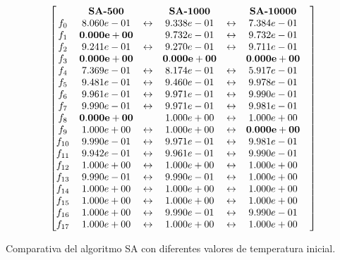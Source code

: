 \begin{table}[!ht]
  \centering
\[
\begin{bmatrix}
   & \textbf{SA-500} &  & \textbf{SA-1000} & & \textbf{SA-10000} \\
f_{0} & 8.060e-01 & \leftrightarrow & 9.338e-01 & \leftrightarrow & 7.384e-01 \\
f_{1} & {\bf 0.000e+00} &  & 9.732e-01 & \leftrightarrow & 9.732e-01 \\
f_{2} & 9.241e-01 & \leftrightarrow & 9.270e-01 & \leftrightarrow & 9.711e-01 \\
f_{3} & {\bf 0.000e+00} &  & {\bf 0.000e+00} &  & {\bf 0.000e+00} &  \\
f_{4} & 7.369e-01 & \leftrightarrow & 8.174e-01 & \leftrightarrow & 5.917e-01 \\
f_{5} & 9.481e-01 & \leftrightarrow & 9.460e-01 & \leftrightarrow & 9.978e-01 \\
f_{6} & 9.961e-01 & \leftrightarrow & 9.971e-01 & \leftrightarrow & 9.990e-01 \\
f_{7} & 9.990e-01 & \leftrightarrow & 9.971e-01 & \leftrightarrow & 9.981e-01 \\
f_{8} & {\bf 0.000e+00} &  & 1.000e+00 & \leftrightarrow & 1.000e+00 \\
f_{9} & 1.000e+00 & \leftrightarrow & 1.000e+00 & \leftrightarrow & {\bf 0.000e+00} &  \\
f_{10} & 9.990e-01 & \leftrightarrow & 9.971e-01 & \leftrightarrow & 9.981e-01 \\
f_{11} & 9.942e-01 & \leftrightarrow & 9.961e-01 & \leftrightarrow & 9.990e-01 \\
f_{12} & 1.000e+00 & \leftrightarrow & 1.000e+00 & \leftrightarrow & 1.000e+00 \\
f_{13} & 9.990e-01 & \leftrightarrow & 9.990e-01 & \leftrightarrow & 1.000e+00 \\
f_{14} & 1.000e+00 & \leftrightarrow & 1.000e+00 & \leftrightarrow & 1.000e+00 \\
f_{15} & 1.000e+00 & \leftrightarrow & 1.000e+00 & \leftrightarrow & 1.000e+00 \\
f_{16} & 1.000e+00 & \leftrightarrow & 9.990e-01 & \leftrightarrow & 9.990e-01 \\
f_{17} & 1.000e+00 & \leftrightarrow & 1.000e+00 & \leftrightarrow & 1.000e+00 \\
\end{bmatrix}
\]
     \captionsetup{justification=centering}
    \caption{Comparativa del algoritmo SA con diferentes valores de temperatura inicial.}    
\end{table}
\newpage
